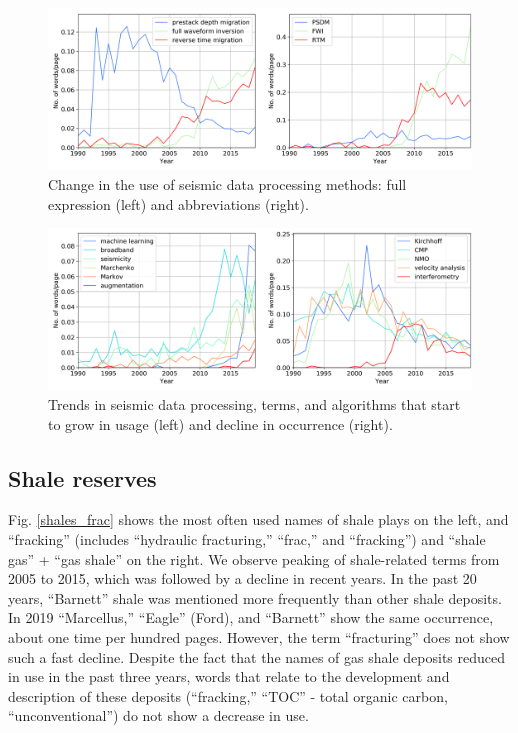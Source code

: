 \documentclass[geosciences,article,submit,moreauthors,pdftex]{Definitions/mdpi}
\begin{document}
\begin{figure}[ht!]

\includegraphics[width=\textwidth]{fwi_rtm_psdm_both.png} 
\caption{Change in the use of seismic data processing methods: full expression (left) and abbreviations (right).}
\label{fwi_psdm}
\end{figure}

\begin{figure}[ht!]

\includegraphics[width=\textwidth]{proc_meth.png} 
\caption{Trends in seismic data processing, terms, and algorithms that start to grow in usage (left) and decline in occurrence (right).}
\label{proc_meth}
\end{figure}




\subsection{Shale reserves} 
Fig. \ref{shales_frac} shows the most often used names of shale plays on the left, and ``fracking'' (includes ``hydraulic fracturing,'' ``frac,'' and ``fracking'') and ``shale gas'' + ``gas shale'' on the right. We observe peaking of shale-related terms from 2005 to 2015, which was followed by a decline in recent years. In the past 20 years, ``Barnett'' shale was mentioned more frequently than other shale deposits. In 2019 ``Marcellus,'' ``Eagle'' (Ford), and ``Barnett'' show the same occurrence, about one time per hundred pages. However, the term ``fracturing'' does not show such a fast decline. Despite the fact that the names of gas shale deposits reduced in use in the past three years, words that relate to the development and description of these deposits (``fracking,'' ``TOC'' - total organic carbon, ``unconventional'') do not show a decrease in use.
\end{document}
